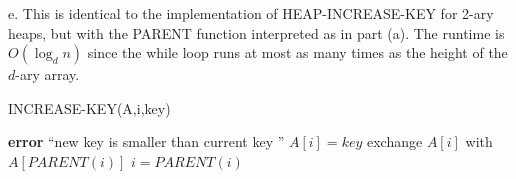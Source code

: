 \documentclass{article}
\begin{document}
e. This is identical to the implementation of HEAP-INCREASE-KEY for 2-ary heaps, but with the PARENT function interpreted as in part (a).  The runtime is $O(\log_d n)$ since the while loop runs at most as many times as the height of the $d$-ary array.\\

\begin{algorithm}
\caption{INCREASE-KEY(A,i,key)}
\begin{algorithmic}[1]
	\State \textbf{error} ``new key is smaller than current key ''
\EndIf
\State $A[i] = key$
\While{$i > 1$ and $A[PARENT(i) < A[i]$}
	\State exchange $A[i]$ with $A[PARENT(i)]$
	\State $i = PARENT(i)$
\EndWhile
\end{algorithmic}
\end{algorithm}
\end{document}
